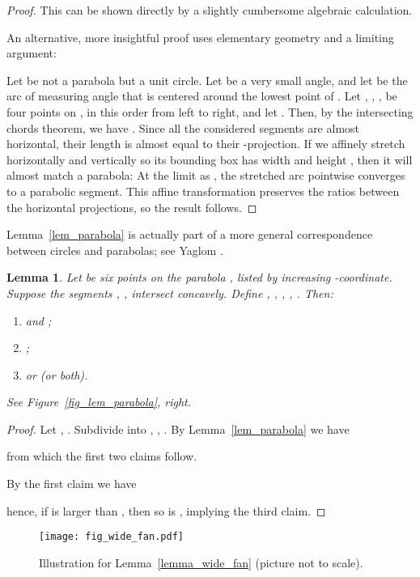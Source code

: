 \documentclass[11pt]{article}
\newtheorem{lemma}[theorem]{Lemma}
\theoremstyle{definition}
\theoremstyle{remark}
\begin{document}
\begin{proof}
This can be shown directly by a slightly cumbersome algebraic calculation.

An alternative, more insightful proof uses elementary geometry and a limiting argument:

Let  be not a parabola but a unit circle. Let  be a very small angle, and let  be the arc of  measuring angle  that is centered around the lowest point of . Let , , ,  be four points on , in this order from left to right, and let . Then, by the intersecting chords theorem, we have . Since all the considered segments are almost horizontal, their length is almost equal to their -projection. If we affinely stretch  horizontally and vertically so its bounding box has width  and height , then it will almost match a parabola: At the limit as , the stretched arc pointwise converges to a parabolic segment. This affine transformation preserves the ratios between the horizontal projections, so the result follows.
\end{proof}

Lemma~\ref{lem_parabola} is actually part of a more general correspondence between circles and parabolas; see Yaglom \cite{yaglom}.

\begin{lemma}\label{lem_ratios}
Let  be six points on the parabola , listed by increasing -coordinate. Suppose the segments , ,  intersect concavely. Define , , , , . Then:
\begin{enumerate}
\item  and ;
\item ;
\item  or  (or both).
\end{enumerate}
See Figure~\ref{fig_lem_parabola}, right.
\end{lemma}

\begin{proof}
Let , . Subdivide  into , , . By Lemma~\ref{lem_parabola} we have

from which the first two claims follow.

By the first claim we have

hence, if  is larger than , then so is , implying the third claim.
\end{proof}

\begin{figure}
\centerline{\texttt{[image: fig\_wide\_fan.pdf]}}
\caption{\label{fig_wide_fan}Illustration for Lemma~\ref{lemma_wide_fan} (picture not to scale).}
\end{figure}
\end{document}
